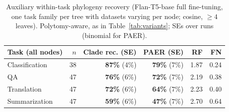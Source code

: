 \documentclass{article}
\theoremstyle{definition}
\theoremstyle{plain}
\begin{document}
\begin{table}[h]
\caption{Auxiliary within-task phylogeny recovery (Flan-T5-base full fine-tuning, one task family per tree with
  datasets varying per node; cosine, $\geq 4$ leaves). Polytomy-aware, as in
  Table~\ref{tab:variants}; SEs over runs (binomial for PAER).}
\label{tab:withintask}
\centering
\small
\begin{tabular}{lrrrrr}
\toprule
Task (all nodes) & $n$ & Clade rec. (SE) & PAER (SE) & RF & FN \\
\midrule
Classification & 38 & \textbf{87\%} (4\%) & \textbf{79\%} (7\%) & 1.87 & 0.24 \\
QA             & 47 & \textbf{76\%} (6\%) & \textbf{72\%} (7\%) & 2.19 & 0.38 \\
Translation    & 47 & \textbf{72\%} (6\%) & \textbf{64\%} (7\%) & 2.23 & 0.40 \\
Summarization  & 47 & \textbf{59\%} (6\%) & \textbf{47\%} (7\%) & 2.70 & 0.64 \\
\bottomrule
\end{tabular}
\end{table}
\end{document}
